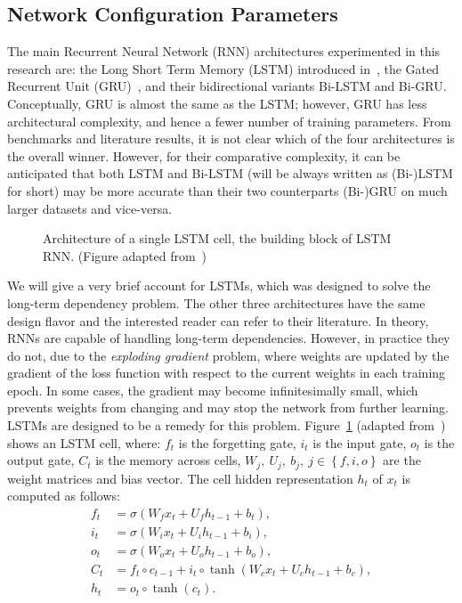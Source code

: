 \subsection{Network Configuration Parameters}\label{sec:param-netw-conf}
The main Recurrent Neural Network (RNN) architectures experimented in this research are: the Long
Short Term Memory (LSTM) introduced in~\cite{Hochreiter1997LongShortTermMemory}, the Gated Recurrent
Unit (GRU)~\citep{Cho2014LearningPhraseRepresentationsUsing}, and their bidirectional variants
Bi-LSTM and Bi-GRU\@. Conceptually, GRU is almost the same as the LSTM; however, GRU has less
architectural complexity, and hence a fewer number of training parameters. From benchmarks and
literature results, it is not clear which of the four architectures is the overall winner. However,
for their comparative complexity, it can be anticipated that both LSTM and Bi-LSTM (will be always
written as (Bi-)LSTM for short) may be more accurate than their two counterparts (Bi-)GRU on much
larger datasets and vice-versa.

\begin{figure}[!tb]
  \centering
  
  \caption{Architecture of a single LSTM cell, the building block of LSTM RNN\@. (Figure adapted
    from~\cite{Colah2015UnderstandingLstmNetworks})}\label{lstm}
\end{figure}

We will give a very brief account for LSTMs, which was designed to solve the long-term dependency
problem. The other three architectures have the same design flavor and the interested reader can
refer to their literature. In theory, RNNs are capable of handling long-term dependencies. However,
in practice they do not, due to the \textit{exploding gradient} problem, where weights are updated
by the gradient of the loss function with respect to the current weights in each training epoch. In
some cases, the gradient may become infinitesimally small, which prevents weights from changing and
may stop the network from further learning. LSTMs are designed to be a remedy for this
problem. Figure~\ref{lstm} (adapted from~\cite{Colah2015UnderstandingLstmNetworks}) shows an LSTM
cell, where: $f_t$ is the forgetting gate, $i_t$ is the input gate, $o_t$ is the output gate, $C_t$
is the memory across cells, $W_j,\ U_j,\ b_j,\ j \in \left\{f, i, o\right\}$ are the weight matrices
and bias vector. The cell hidden representation $h_t$ of $x_t$ is computed as follows:%
\begin{align*}
  f_t  &= \sigma(W_f  x_t + U_f h_{t-1} + b_t),\\
  i_t  &= \sigma(W_i  x_t + U_i h_{t-1} + b_i),\\
  o_t  &= \sigma(W_o  x_t + U_o h_{t-1} + b_o),\\
  C_t  &= f_t \circ c_{t-1} + i_t \circ \tanh(W_c x_t + U_c h_{t-1} + b_c),\\
  h_t  &= o_t \circ \tanh(c_t).
\end{align*}

